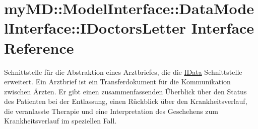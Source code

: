 \hypertarget{interfacemy_m_d_1_1_model_interface_1_1_data_model_interface_1_1_i_doctors_letter}{
\section{my\-MD::Model\-Interface::Data\-Model\-Interface::IDoctors\-Letter Interface Reference}
\label{db/d8c/interfacemy_m_d_1_1_model_interface_1_1_data_model_interface_1_1_i_doctors_letter}
}
Schnittstelle f\"{u}r die Abstraktion eines Arztbriefes, die die \hyperlink{interfacemy_m_d_1_1_model_interface_1_1_data_model_interface_1_1_i_data}{IData} Schnittstelle erweitert. Ein Arztbrief ist ein Transferdokument f\"{u}r die Kommunikation zwischen \"{A}rzten. Er gibt einen zusammenfassenden \"{U}berblick \"{u}ber den Status des Patienten bei der Entlassung, einen R\"{u}ckblick \"{u}ber den Krankheitsverlauf, die veranlasste Therapie und eine Interpretation des Geschehens zum Krankheitsverlauf im speziellen Fall.  


